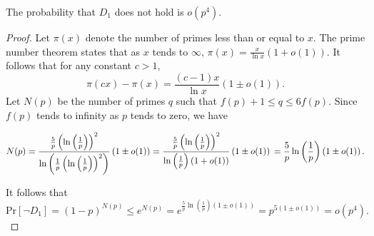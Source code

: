 \documentclass[10pt,a4paper]{amsart}
\def\Pr{\ensuremath{\mathrm{Pr}}}
\begin{document}
\begin{proposition} \label{prop:notD1}
 The probability that $D_1$ does not hold is $o\left(p^4\right)$. 
\end{proposition}

\begin{proof}
  Let $\pi(x)$ denote the number of primes less than or equal to $x$. The prime number theorem states that as $x$ tends to $\infty$, $\pi(x) = \frac{x}{\ln x} \left( 1 + o(1) \right)$. It follows that for any constant $c > 1$,
  \[ \pi(cx) - \pi(x) = \frac{(c-1)x}{\ln x} \left( 1 \pm o(1) \right). \]
  Let $N(p)$ be the number of primes $q$ such that $f(p)+1 \leq q \leq 6f(p)$. Since $f(p)$ tends to infinity as $p$ tends to zero, we have  

\[ N(p) = \frac{\frac{5}{p} \left( \ln \left( \frac{1}{p} \right) \right)^2}
    {\ln \left( \frac{1}{p} \left( \ln \left( \frac{1}{p} \right) \right)^2 \right)}
    \left( 1 \pm o(1) \right) = \frac{\frac{5}{p} \left( \ln \left( \frac{1}{p} \right) \right)^2}
         {\ln \left( \frac{1}{p} \right) \left( 1 + o(1) \right)}
         \left( 1 \pm o(1) \right) \\
        = \frac{5}{p} \ln \left( \frac{1}{p} \right) \left( 1 \pm o(1) \right).\]

  It follows that
  \[ \Pr\left[ \lnot D_1 \right] = (1-p)^{N(p)} \leq e^{N(p)} = e^{\frac{5}{p} \ln \left( \frac{1}{p} \right) \left( 1 \pm o(1) \right)} 
    = p^{5 \left( 1 \pm o(1) \right)}  = o\left(p^4\right).\]
\end{proof}
\end{document}
